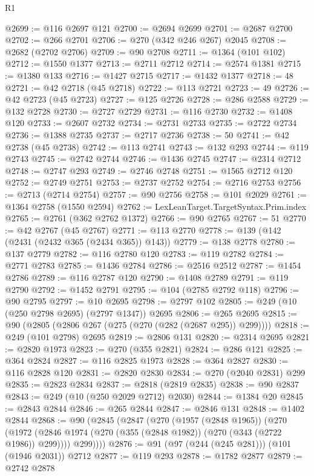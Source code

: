 \begin{lexlean}{R1}
\begin{coremodule}
@2699 := @116 @2697 @121
@2700 := @2694 @2699
@2701 := @2687 @2700
@2702 := @266 @2701
@2706 := @270 (@342 @246 @267) @2045
@2708 := @2682 (@2702 @2706)
@2709 := @90 @2708
@2711 := @1364 (@101 @102)
@2712 := @1550 @1377
@2713 := @2711 @2712
@2714 := @2574 @1381
@2715 := @1380 @133
@2716 := @1427 @2715
@2717 := @1432 @1377
@2718 := 48
@2721 := @42 @2718 (@45 @2718)
@2722 := @113 @2721
@2723 := 49
@2726 := @42 @2723 (@45 @2723)
@2727 := @125 @2726
@2728 := @286 @2588
@2729 := @132 @2728
@2730 := @2727 @2729
@2731 := @116 @2730
@2732 := @1408 @120
@2733 := @2607 @2732
@2734 := @2731 @2733
@2735 := @2722 @2734
@2736 := @1388 @2735
@2737 := @2717 @2736
@2738 := 50
@2741 := @42 @2738 (@45 @2738)
@2742 := @113 @2741
@2743 := @132 @293
@2744 := @119 @2743
@2745 := @2742 @2744
@2746 := @1436 @2745
@2747 := @2314 @2712
@2748 := @2747 @293
@2749 := @2746 @2748
@2751 := @1565 @2712 @120
@2752 := @2749 @2751
@2753 := @2737 @2752
@2754 := @2716 @2753
@2756 := @2713 (@2714 @2754)
@2757 := @90 @2756
@2758 := @101 @2029
@2761 := @1364 @2758 (@1550 @2594)
@2762 := LexLeanTarget.TargetSyntax.Prim.index
@2765 := @2761 (@362 @2762 @1372)
@2766 := @90 @2765
@2767 := 51
@2770 := @42 @2767 (@45 @2767)
@2771 := @113 @2770
@2778 := @139 (@142 (@2431 (@2432 @365 (@2434 @365)) @143))
@2779 := @138 @2778
@2780 := @137 @2779
@2782 := @116 @2780 @120
@2783 := @119 @2782
@2784 := @2771 @2783
@2785 := @1436 @2784
@2786 := @2516 @2512
@2787 := @1454 @2786
@2789 := @116 @2787 @120
@2790 := @1408 @2789
@2791 := @119 @2790
@2792 := @1452 @2791
@2795 := @104 (@2785 @2792 @118)
@2796 := @90 @2795
@2797 := @10 @2695
@2798 := @2797 @102
@2805 := @249 (@10 (@250 @2798 @2695) (@2797 @1347)) @2695
@2806 := @265 @2695
@2815 := @90 (@2805 (@2806 @267 (@275 (@270 (@282 (@2687 @295)) @299))))
@2818 := @249 (@101 @2798) @2695
@2819 := @2806 @131
@2820 := @2314 @2695
@2821 := @2820 @1973
@2823 := @270 (@355 @2821)
@2824 := @286 @121
@2825 := @364 @2824
@2827 := @116 @2825 @1973
@2828 := @364 @2827
@2830 := @116 @2828 @120
@2831 := @2820 @2830
@2834 := @270 (@2040 @2831) @299
@2835 := @2823 @2834
@2837 := @2818 (@2819 @2835)
@2838 := @90 @2837
@2843 := @249 (@10 (@250 @2029 @2712) @2030)
@2844 := @1384 @20
@2845 := @2843 @2844
@2846 := @265 @2844
@2847 := @2846 @131
@2848 := @1402 @2844
@2868 := @90
    (@2845
      (@2847
        (@270
          (@1957 (@2848 @1965))
          (@270
            (@1972 (@2846 @1974 (@270 (@355 (@2848 @1982)) (@270 (@343 (@2722 @1986)) @299))))
            @299))))
@2876 := @91 (@97 (@244 (@245 @281))) (@101 (@1946 @2031)) @2712
@2877 := @119 @293
@2878 := @1782 @2877
@2879 := @2742 @2878

\end{coremodule}
\end{lexlean}
